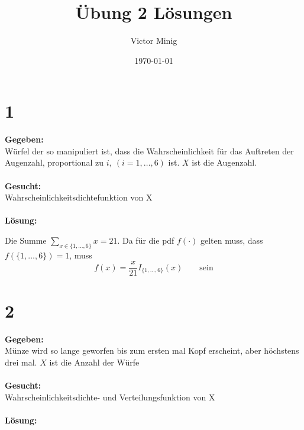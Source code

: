 \documentclass{article}
\begin{document}
\title{Übung 2 Lösungen}
\author{Victor Minig}
\date{\today}
\maketitle


\section*{1}
\textbf{Gegeben:} \\

Würfel der so manipuliert ist, dass die Wahrscheinlichkeit für das Auftreten der Augenzahl, proportional zu $i, ~ (i = 1, \ldots, 6)$ ist. $X$ ist die Augenzahl.\\ \\
\textbf{Gesucht: } \\

Wahrscheinlichkeitsdichtefunktion von X\\ \\
\textbf{Lösung:}

Die Summe $\sum_{x\in \{ 1, \ldots, 6\}} x = 21$. Da für die pdf $f(\cdot)$ gelten muss, dass $f(\{1, \ldots, 6\}) = 1$, muss  \[f(x) = \frac{x}{21} I_{\{1, \ldots, 6\}}(x)\qquad \text{sein}\]

\section*{2}
\textbf{Gegeben:} \\

Münze wird so lange geworfen bis zum ersten mal Kopf erscheint, aber höchstens drei mal. $X$ ist die Anzahl der Würfe \\ \\
\textbf{Gesucht: } \\

Wahrscheinlichkeitsdichte- und Verteilungsfunktion von X\\ \\
\textbf{Lösung:} \\
\end{document}
